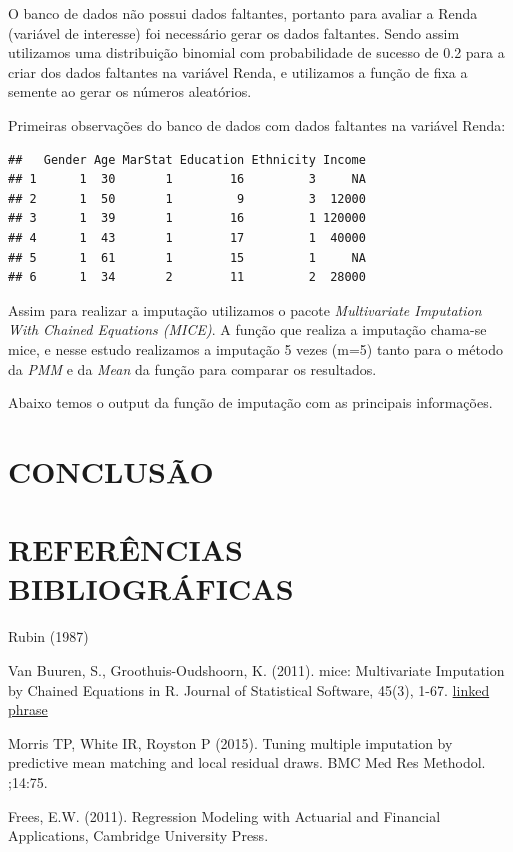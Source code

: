 \documentclass[]{article}
\begin{document}
O banco de dados não possui dados faltantes, portanto para avaliar a
Renda (variável de interesse) foi necessário gerar os dados faltantes.
Sendo assim utilizamos uma distribuição binomial com probabilidade de
sucesso de 0.2 para a criar dos dados faltantes na variável Renda, e
utilizamos a função de fixa a semente ao gerar os números aleatórios.

Primeiras observações do banco de dados com dados faltantes na variável
Renda:

\begin{verbatim}
##   Gender Age MarStat Education Ethnicity Income
## 1      1  30       1        16         3     NA
## 2      1  50       1         9         3  12000
## 3      1  39       1        16         1 120000
## 4      1  43       1        17         1  40000
## 5      1  61       1        15         1     NA
## 6      1  34       2        11         2  28000
\end{verbatim}

Assim para realizar a imputação utilizamos o pacote \emph{Multivariate
Imputation With Chained Equations (MICE)}. A função que realiza a
imputação chama-se mice, e nesse estudo realizamos a imputação 5 vezes
(m=5) tanto para o método da \emph{PMM} e da \emph{Mean} da função para
comparar os resultados.

Abaixo temos o output da função de imputação com as principais
informações.

\section{CONCLUSÃO}\label{conclusao}

\section{REFERÊNCIAS BIBLIOGRÁFICAS}\label{referencias-bibliograficas}

Rubin (1987)

Van Buuren, S., Groothuis-Oudshoorn, K. (2011). mice: Multivariate
Imputation by Chained Equations in R. Journal of Statistical Software,
45(3), 1-67. \href{http://www.jstatsoft.org/v45/i03/}{linked phrase}

Morris TP, White IR, Royston P (2015). Tuning multiple imputation by
predictive mean matching and local residual draws. BMC Med Res Methodol.
;14:75.

Frees, E.W. (2011). Regression Modeling with Actuarial and Financial
Applications, Cambridge University Press.
\end{document}
